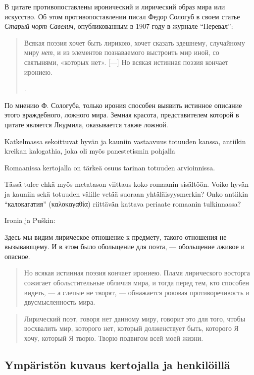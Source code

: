 \documentclass[12pt,a4paper]{article}
\begin{document}
В цитате противопоставлены иронический и лирический образ мира или искусство. Об этом противопоставлении писал Федор Сологуб в своем статье \textit{Старый чорт Савелич}, опубликованным в 1907 году в журнале \enquote{Перевал}:  

\begin{quote}
Всякая поэзия хочет быть лирикою, хочет сказать здешнему,
случайному миру \textit{нет}, и из элементов познаваемого выстроить
мир иной, со святынями, «которых нет».
[---]
Но всякая истинная поэзия кончает ирониею.

\parencite[164]{sologub1991}.
\end{quote}

По мнению Ф. Сологуба, только ирония способен выявить истинное описание этого враждебного, ложного мира. Земная красота, представителем которой в цитате является Людмила, оказывается также ложной.  


Katkelmassa sekoittuvat hyvän ja kauniin vastaavuus totuuden kanssa, antiikin kreikan kalogathia, joka oli myös panestetismin pohjalla

Romaanissa kertojalla on tärkeä osuus tarinan totuuden arvioinnissa. 

Tässä tulee ehkä myös metatason viittaus koko romaanin sisältöön. Voiko hyvän ja kauniin sekä totuuden välille vetää suoraan yhtäläisyysmerkin? Onko antiikin \enquote{калокагатия} (\foreignlanguage{greek}{καλοκαγαθία}) riittävän kattava periaate romaanin tulkinnassa?

Ironia ja Puškin:

 Здесь мы видим лирическое отношение к предмету, такого отношения не вызывающему. И в этом было обольщение для поэта, — обольщение лживое и опасное. 
 


\begin{quote}
Но всякая истинная поэзия кончает ирониею. Пламя лирического восторга сожигает обольстительные обличия мира, и тогда перед тем, кто способен видеть, — а слепые не творят, — обнажается роковая противоречивость и двусмысленность мира.
\end{quote}

\begin{quote}
 Лирический поэт, говоря нет данному миру, говорит это для того, чтобы восхвалить мир, которого нет, который долженствует быть, которого Я хочу, который Я творю. Творю подвигом всей моей жизни. 
 \end{quote}

\subsection{Ympäristön kuvaus kertojalla ja henkilöillä}
\end{document}
